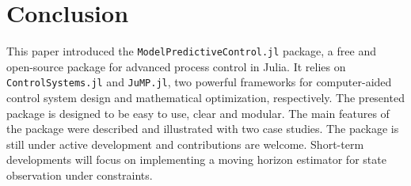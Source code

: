 \section{Conclusion}

This paper introduced the \texttt{ModelPredictiveControl.jl} package, a free and open-source package for advanced process control in Julia. It relies on \texttt{ControlSystems.jl} and \texttt{JuMP.jl}, two powerful frameworks for computer-aided control system design and mathematical optimization, respectively. The presented package is designed to be easy to use, clear and modular. The main features of the package were described and illustrated with two case studies. The package is still under active development and contributions are welcome. Short-term developments will focus on implementing a moving horizon estimator for state observation under constraints. 